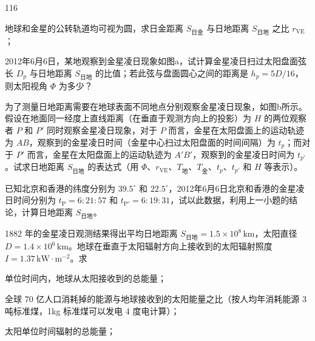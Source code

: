 \begin{problem}[第36届全国中学生物理竞赛决赛][构建太阳模型]{116}
\begin{subproblem}
        \begin{subsubproblem}
            地球和金星的公转轨道均可视为圆，求日金距离 $S_{\text{日金}}$ 与日地距离 $S_{\text{日地}}$ 之比 $r_{\mathrm{VE}}$；
        \end{subsubproblem}
        \begin{subsubproblem}
            2012年6月6日，某地观察到金星凌日现象如图a，试计算金星凌日扫过太阳盘面弦长 $D_{p}$ 与日地距离 $S_{\text{日地}}$ 的比值；若此弦与盘面圆心之间的距离是 $h_{p}=5D/16$，则太阳视角 $\Phi$ 为多少？
        \end{subsubproblem}
        \begin{subsubproblem}
            为了测量日地距离需要在地球表面不同地点分别观察金星凌日现象，如图b所示。假设在地面同一经度上直线距离（在垂直于观测方向上的投影）为 $H$ 的两位观察者 $P$ 和 $P'$ 同时观察金星凌日现象，对于 $P$ 而言，金星在太阳盘面上的运动轨迹为 $AB$，观察到的金星凌日时间（金星中心扫过太阳盘面的时间间隔）为 $t_{p}$；而对于 $P'$ 而言，金星在太阳盘面上的运动轨迹为 $A'B'$，观察到的金星凌日时间为 $t_{p'}$。试求日地距离 $S_{\text{日地}}$ 的表达式（用 $\Phi$、$r_{\mathrm{VE}}$、$T_{\text{地}}$、$T_{\text{金}}$、$t_{p}$、$t_{p'}$ 和 $H$ 等表示）。
        \end{subsubproblem}
        \begin{subsubproblem}
            已知北京和香港的纬度分别为 $39.5^{\circ}$ 和 $22.5^{\circ}$，2012年6月6日北京和香港的金星凌日时间分别为 $t_{\mathrm{P}} = 6:21:57$ 和 $t_{\mathrm{P}'} = 6:19:31$，试以此数据，利用上一小题的结论，计算日地距离 $S_{\text{日地}}$。
        \end{subsubproblem}
    \end{subproblem}
    \begin{subproblem}
        1882 年的金星凌日观测结果得出平均日地距离 $S_{\text{日地}} = 1.5 \times 10^{8} \,\mathrm{km}$，太阳直径 $D = 1.4 \times 10^{6} \,\mathrm{km}$。地球在垂直于太阳辐射方向上接收到的太阳辐射照度 $I = 1.37 \,\mathrm{kW} \cdot \mathrm{m}^{-2}$。求
        \begin{subsubproblem}
            单位时间内，地球从太阳接收到的总能量；
        \end{subsubproblem}
        \begin{subsubproblem}
            全球 70 亿人口消耗掉的能源与地球接收到的太阳能量之比（按人均年消耗能源 3 吨标准煤，1kg 标准煤可以发电 4 度电计算）；
        \end{subsubproblem}
        \begin{subsubproblem}
            太阳单位时间辐射的总能量；
        \end{subsubproblem}

\end{subproblem}
\end{problem}
